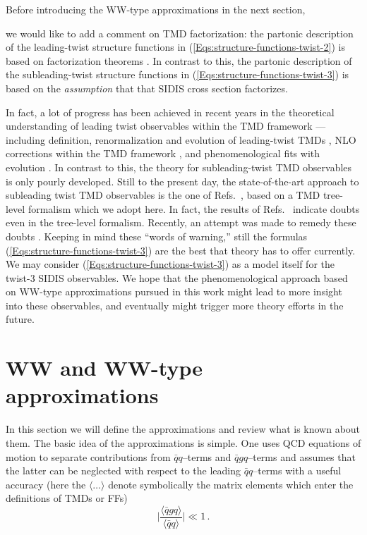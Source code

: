 \documentclass[a4paper,11pt]{article}
\newcommand{\be}{\begin{equation}}
\newcommand{\ee}{\end{equation}}
\newcommand{\la}{\langle}
\newcommand{\ra}{\rangle}
\newcommand{\darkgreen}[1]{{\color{darkgreen} #1}}
\newcommand{\ms}[1]{\darkgreen{ #1}}
\begin{document}
Before introducing the WW-type approximations in the next section, 
\ms{we would like to add a comment on TMD factorization: the 
partonic description of the leading-twist structure functions in 
(\ref{Eqs:structure-functions-twist-2}) is based on factorization 
theorems \cite{Collins:1981uk,Ji:2004wu,Ji:2004xq,Collins:2011zzd,
Echevarria:2012js}. In contrast to this, the partonic description 
of the subleading-twist structure functions in 
(\ref{Eqs:structure-functions-twist-3}) is based on the
{\it assumption} that that SIDIS cross section factorizes.

In fact, a lot of progress has been achieved in recent years in the 
theoretical understanding of leading twist observables within the TMD 
framework --- including definition, renormalization and evolution of 
leading-twist TMDs \cite{Aybat:2011zv,Aybat:2011ge,Echevarria:2014xaa},
NLO corrections within the TMD framework \cite{Ma:2013aca}, and  
phenomenological fits with evolution \cite{Aybat:2011ta,Kang:2015msa}.
In contrast to this, the theory for subleading-twist TMD observables is 
only pourly developed. Still to the present day, the state-of-the-art 
approach to subleading twist TMD observables is the one of 
Refs.~\cite{Kotzinian:1994dv,Mulders:1995dh,Boer:1997nt,Goeke:2005hb,
Bacchetta:2006tn}, 
based on a TMD tree-level formalism which we adopt here.
In fact, the results of Refs.~\cite{Metz:2004je,Gamberg:2006ru}
indicate doubts even in the tree-level formalism. 
Recently, an attempt was made to remedy these doubts \cite{Chen:2016hgw}.
Keeping in mind these ``words of warning,'' still the formulas 
(\ref{Eqs:structure-functions-twist-3}) 
are the best that theory has to offer currently. We may consider 
(\ref{Eqs:structure-functions-twist-3}) as a model itself for 
the twist-3 SIDIS observables. We hope that the phenomenological 
approach based on WW-type approximations pursued in this work might 
lead to more insight into these observables, and eventually might 
trigger more theory efforts in the future.
}

\section{WW and WW-type approximations}
\label{Sec-3:WW}

In this section we will define the approximations and review what is
known about them.
The basic idea of the approximations is simple. One uses QCD
equations of motion to separate contributions from $\bar{q}q$--terms 
and $\bar{q}gq$--terms and assumes that the latter can be neglected 
with respect to the leading $\bar{q}q$--terms with a useful accuracy
(here the $\la\dots\ra$ denote symbolically the matrix elements 
which enter the definitions of TMDs or FFs)
\be\label{Eq:WW-generic}
	\biggl|\frac{\la\bar{q}gq\ra}{\la\bar{q}q\ra}\biggr| \ll 1\,.
\ee
\end{document}
